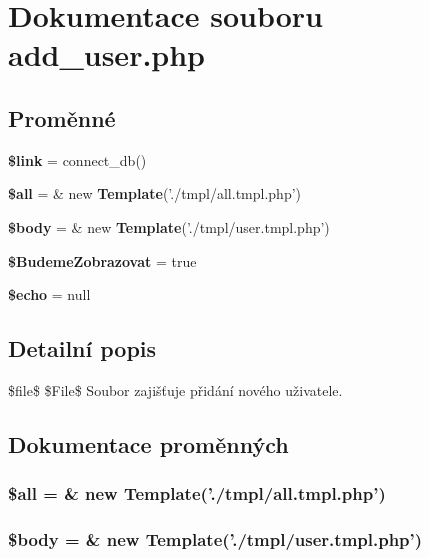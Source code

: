 \section{Dokumentace souboru add\_\-user.php}
\label{add__user_8php}
\subsection*{Proměnné}
\begin{CompactItemize}
\item 
{\bf \$link} = connect\_\-db()
\item 
{\bf \$all} = \& new {\bf Template}('./tmpl/all.tmpl.php')
\item 
{\bf \$body} = \& new {\bf Template}('./tmpl/user.tmpl.php')
\item 
{\bf \$BudemeZobrazovat} = true
\item 
{\bf \$echo} = null
\end{CompactItemize}


\subsection{Detailní popis}
\$file\$ \$File\$ Soubor zajišťuje přidání nového uživatele. 

\subsection{Dokumentace proměnných}
\subsubsection{\setlength{\rightskip}{0pt plus 5cm}\$all = \& new {\bf Template}('./tmpl/all.tmpl.php')}\label{add__user_8php_3c74ea9d2348c9aba28d36e692bef2d2}


\subsubsection{\setlength{\rightskip}{0pt plus 5cm}\$body = \& new {\bf Template}('./tmpl/user.tmpl.php')}\label{add__user_8php_26b9f9373f7bb79dfcf8a86dff086b45}


